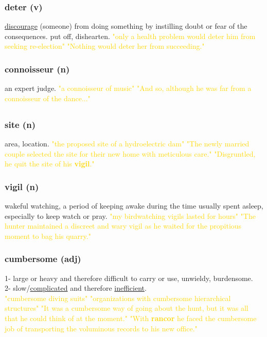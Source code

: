 \documentclass{proc}
\begin{document}
	\subsubsection{\textcolor{brickred}{deter} (v)}
	\underline{discourage} (someone) from doing something by instilling doubt or fear of the consequences. put off, dishearten.
	\textcolor{gold}{"only a health problem would deter him from seeking re-election" "Nothing would deter her from succeeding."}
	
	\subsubsection{\textcolor{brickred}{connoisseur} (n)}
	an expert judge.
	\textcolor{gold}{"a connoisseur of music" "And so, although he was far from a connoisseur of the dance..."}
	
	\newpage
	\setcounter{section}{34}
	\setcounter{subsection}{0}
	
	\newpage
	\subsection{}
	\subsubsection{\textcolor{brickred}{site} (n)}
	area, location.
	\textcolor{gold}{"the proposed site of a hydroelectric dam" "The newly married couple selected the site for their new home with meticulous care." "Disgruntled, he quit the site of his \textbf{vigil}."}
	
	\subsubsection{\textcolor{brickred}{vigil} (n)}
	wakeful watching, a period of keeping awake during the time usually spent asleep, especially to keep watch or pray.
	\textcolor{gold}{"my birdwatching vigils lasted for hours" "The hunter maintained a discreet and wary vigil as he waited for the propitious moment to bag his quarry."}
	
	\subsubsection{\textcolor{brickred}{cumbersome} (adj)}
	1- large or heavy and therefore difficult to carry or use, unwieldy, burdensome.\\
	2- slow/\underline{complicated} and therefore \underline{inefficient}.\\
	\textcolor{gold}{"cumbersome diving suits" "organizations with cumbersome hierarchical structures" "It  was  a cumbersome way of going about the hunt, but it was all that he  could think of at the moment." "With \textbf{rancor} he faced the cumbersome job of transporting the voluminous records to his new office."}
	
\end{document}

